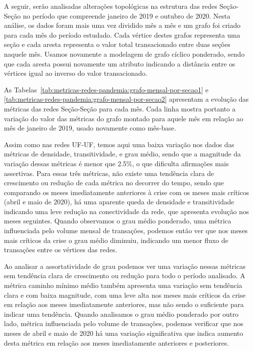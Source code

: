A seguir, serão analisadas alterações topológicas na estrutura das redes Seção-Seção no período que compreende janeiro de 2019 e outubro de 2020. Nesta análise, os dados foram mais uma vez dividido mês a mês e um grafo foi criado para cada mês do período estudado. Cada vértice destes grafos representa uma seção e cada aresta representa o valor total transacionado entre duas seções naquele mês. Usamos novamente a modelagem de grafo cíclico ponderado, sendo que cada aresta possui novamente um atributo indicando a distância entre os vértices igual ao inverso do valor transacionado.

As Tabelas~\ref{tab:metricas-redes-pandemia:grafo-mensal-por-secao1} e \ref{tab:metricas-redes-pandemia:grafo-mensal-por-secao2} apresentam a evolução das métricas das redes Seção-Seção para cada mês. Cada linha mostra portanto a variação do valor das métricas do grafo montado para aquele mês em relação ao mês de janeiro de 2019, usado novamente como mês-base.

Assim como nas redes UF-UF, temos aqui uma baixa variação nos dados das métricas de densidade, transitividade, e grau médio, sendo que a magnitude da variação dessas métricas é menor que 2.5\%, o que dificulta afirmações mais assertivas. Para essas três métricas, não existe uma tendência clara de crescimento ou redução de cada métrica no decorrer do tempo, sendo que comparando os meses imediatamente anteriores à crise com os meses mais críticos (abril e maio de 2020), há uma aparente queda de densidade e transitividade indicando uma leve redução na conectividade da rede, que apresenta evolução nos meses seguintes. Quando observamos o grau médio ponderado, uma métrica influenciada pelo volume mensal de transações, podemos então ver que nos meses mais críticos da crise o grau médio diminuiu, indicando um menor fluxo de transações entre os vértices das redes.

Ao analisar a assortatividade de grau podemos ver uma variação nessas métricas sem tendência clara de crescimento ou redução para todo o período analisado. A métrica caminho mínimo médio também apresenta uma variação sem tendência clara e com baixa magnitude, com uma leve alta nos meses mais críticos da crise em relação aos meses imediatamente anteriores, mas não sendo o suficiente para indicar uma tendência. Quando analisamos o grau médio ponderado por outro lado, métrica influenciada pelo volume de transações, podemos verificar que nos meses de abril e maio de 2020 há uma variação significativa que indica aumento desta métrica em relação aos meses imediatamente anteriores e posteriores.

